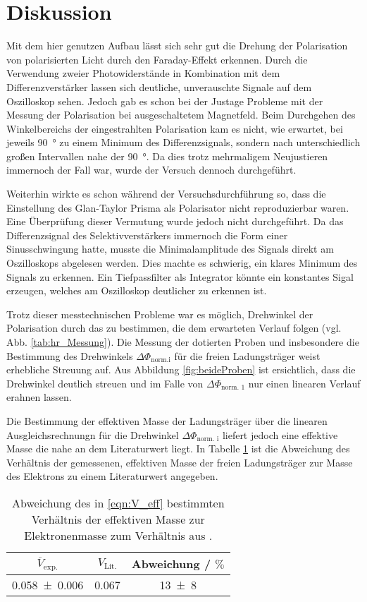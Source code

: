 \section{Diskussion}

Mit dem hier genutzen Aufbau lässt sich sehr gut die Drehung der Polarisation von polarisierten Licht durch den Faraday-Effekt erkennen.
Durch die Verwendung zweier Photowiderstände in Kombination mit dem Differenzverstärker lassen sich deutliche, unverauschte Signale auf dem Oszilloskop sehen.
Jedoch gab es schon bei der Justage Probleme mit der Messung der Polarisation bei ausgeschaltetem Magnetfeld.
Beim Durchgehen des Winkelbereichs der eingestrahlten Polarisation kam es nicht, wie erwartet, bei jeweils \SI{90}{\degree} zu einem Minimum des Differenzsignals,
sondern nach unterschiedlich großen Intervallen nahe der \SI{90}{\degree}.
Da dies trotz mehrmaligem Neujustieren immernoch der Fall war, wurde der Versuch dennoch durchgeführt.
\par \medskip
Weiterhin wirkte es schon während der Versuchsdurchführung so, dass die Einstellung des Glan-Taylor Prisma als Polarisator nicht reproduzierbar waren.
Eine Überprüfung dieser Vermutung wurde jedoch nicht durchgeführt.
Da das Differenzsignal des Selektivverstärkers immernoch die Form einer Sinusschwingung hatte, musste die Minimalamplitude des Signals direkt am Oszilloskops abgelesen werden.
Dies machte es schwierig, ein klares Minimum des Signals zu erkennen. Ein Tiefpassfilter als Integrator könnte ein konstantes Sigal erzeugen, welches am Oszilloskop deutlicher zu erkennen ist.
\par \medskip
Trotz dieser messtechnischen Probleme war es möglich, Drehwinkel der Polarisation durch das  zu bestimmen, die dem erwarteten Verlauf folgen (vgl. Abb. \ref{tab:hr_Messung}).
Die Messung der dotierten Proben und insbesondere die Bestimmung des Drehwinkels $\Delta \Phi_\text{norm.i}$ für die freien Ladungsträger weist erhebliche Streuung auf.
Aus Abbildung \ref{fig:beideProben} ist ersichtlich, dass die Drehwinkel deutlich streuen und im Falle von $\Delta \Phi_\text{norm. 1}$ nur einen linearen Verlauf erahnen lassen.
\par\medskip
Die Bestimmung der effektiven Masse der Ladungsträger über die linearen Ausgleichsrechnungn für die Drehwinkel $\Delta \Phi_\text{norm. i}$ liefert jedoch eine effektive Masse die nahe an dem Literaturwert liegt.
In Tabelle \ref{tab:Abweichung_lit} ist die Abweichung des Verhältnis der gemessenen, effektiven Masse der freien Ladungsträger zur Masse des Elektrons zu einem Literaturwert angegeben.
\begin{table}[H]
  \centering
  \caption{Abweichung des in \eqref{eqn:V_eff} bestimmten Verhältnis der effektiven Masse zur Elektronenmasse zum Verhältnis aus \cite{eff_lit}.}
  \label{tab:Abweichung_lit}
  \begin{tabular}{ccc}
    \toprule
    $\overline{V}_\text{exp.}$ & $V_\text{Lit.}$ &  Abweichung / $\si{\percent}$ \\
    \midrule
    \num{0.058(6)} & 0.067 & \num{13(8)} \\
    \bottomrule
  \end{tabular}
\end{table}
